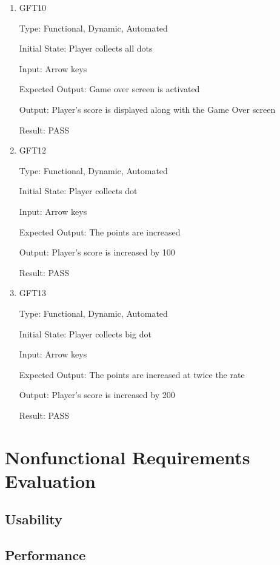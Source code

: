\documentclass[12pt, titlepage]{article}
\begin{document}
\begin{enumerate}

\item{GFT10\\}

Type: Functional, Dynamic, Automated
					
Initial State: Player collects all dots
					
Input: Arrow keys
					
Expected Output: Game over screen is activated

Output: Player's score is displayed along with the Game Over screen

Result: PASS

\item{GFT12\\}

Type: Functional, Dynamic, Automated
					
Initial State: Player collects dot
					
Input: Arrow keys
					
Expected Output: The points are increased

Output: Player's score is increased by 100

Result: PASS

\item{GFT13\\}

Type: Functional, Dynamic, Automated
					
Initial State: Player collects big dot
					
Input: Arrow keys
					
Expected Output: The points are increased at twice the rate

Output: Player's score is increased by 200

Result: PASS

\end{enumerate}

\section{Nonfunctional Requirements Evaluation}

\subsection{Usability}
		
\subsection{Performance}
\end{document}
